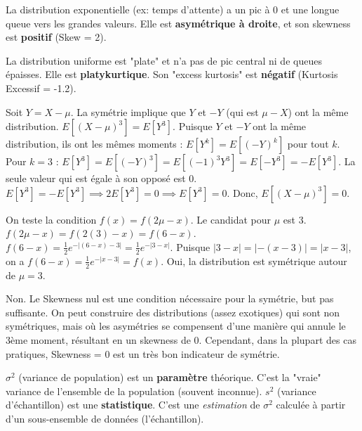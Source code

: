 \begin{correctionbox}
La distribution exponentielle (ex: temps d'attente) a un pic à 0 et une longue queue vers les grandes valeurs. Elle est \textbf{asymétrique à droite}, et son skewness est \textbf{positif} (Skew = 2).
\end{correctionbox}

\begin{correctionbox}
La distribution uniforme est "plate" et n'a pas de pic central ni de queues épaisses. Elle est \textbf{platykurtique}. Son "excess kurtosis" est \textbf{négatif} (Kurtosis Excessif = -1.2).
\end{correctionbox}

\begin{correctionbox}
Soit $Y = X - \mu$. La symétrie implique que $Y$ et $-Y$ (qui est $\mu - X$) ont la même distribution.
$E[(X-\mu)^3] = E[Y^3]$.
Puisque $Y$ et $-Y$ ont la même distribution, ils ont les mêmes moments : $E[Y^k] = E[(-Y)^k]$ pour tout $k$.
Pour $k=3$ :
$E[Y^3] = E[(-Y)^3] = E[(-1)^3 Y^3] = E[-Y^3] = -E[Y^3]$.
La seule valeur qui est égale à son opposé est 0.
$E[Y^3] = -E[Y^3] \implies 2 E[Y^3] = 0 \implies E[Y^3] = 0$.
Donc, $E[(X-\mu)^3] = 0$.
\end{correctionbox}

\begin{correctionbox}
On teste la condition $f(x) = f(2\mu - x)$. Le candidat pour $\mu$ est 3.
$f(2\mu - x) = f(2(3) - x) = f(6 - x)$.
$f(6 - x) = \frac{1}{2}e^{-|(6-x)-3|} = \frac{1}{2}e^{-|3-x|}$.
Puisque $|3-x| = |-(x-3)| = |x-3|$, on a $f(6-x) = \frac{1}{2}e^{-|x-3|} = f(x)$.
Oui, la distribution est symétrique autour de $\mu=3$.
\end{correctionbox}

\begin{correctionbox}
Non. Le Skewness nul est une condition nécessaire pour la symétrie, but pas suffisante.
On peut construire des distributions (assez exotiques) qui sont non symétriques, mais où les asymétries se compensent d'une manière qui annule le 3ème moment, résultant en un skewness de 0. Cependant, dans la plupart des cas pratiques, Skewness = 0 est un très bon indicateur de symétrie.
\end{correctionbox}

\begin{correctionbox}
$\sigma^2$ (variance de population) est un \textbf{paramètre} théorique. C'est la "vraie" variance de l'ensemble de la population (souvent inconnue).
$s^2$ (variance d'échantillon) est une \textbf{statistique}. C'est une \textit{estimation} de $\sigma^2$ calculée à partir d'un sous-ensemble de données (l'échantillon).
\end{correctionbox}

